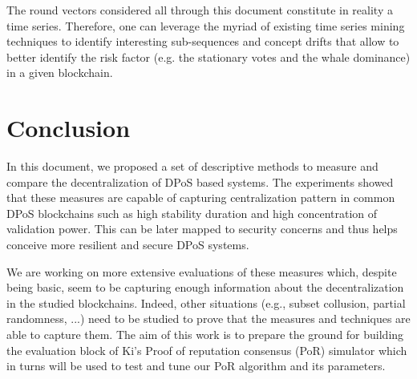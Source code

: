 \documentclass{article}
\begin{document}
The round vectors considered all through this document constitute in reality a time series. Therefore, one can leverage the myriad of existing time series mining techniques to identify interesting sub-sequences and concept drifts that allow to better identify the risk factor (e.g. the stationary votes and the whale dominance) in a given blockchain.     
\section{Conclusion}
\label{sec:conclusion}
In this document, we proposed a set of descriptive methods to measure and compare the decentralization of DPoS based systems. The experiments showed that these measures are capable of capturing centralization pattern in common DPoS blockchains such as high stability duration and high concentration of validation power. This can be later mapped to security concerns and thus helps conceive more resilient and secure DPoS systems.  

We are working on more extensive evaluations of these measures which, despite being basic, seem to be capturing enough information about the decentralization in the studied blockchains. Indeed, other situations (e.g., subset collusion, partial randomness, ...) need to be studied to prove that the measures and techniques are able to capture them. The aim of this work is to prepare the ground for building the evaluation block of Ki's Proof of reputation consensus (PoR) simulator which in turns will be used to test and tune our PoR algorithm and its parameters.



\end{document}
